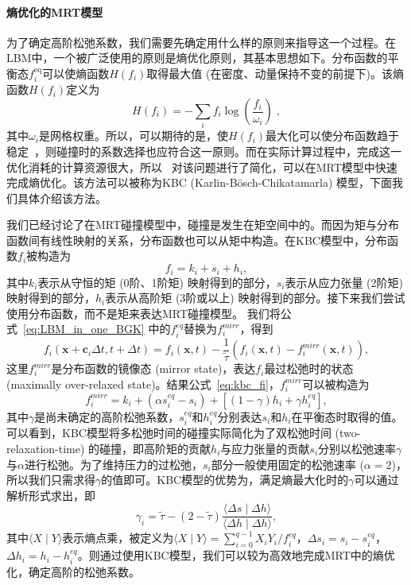 \paragraph{熵优化的MRT模型}
为了确定高阶松弛系数，我们需要先确定用什么样的原则来指导这一个过程。在LBM中，一个被广泛使用的原则是熵优化原则，其基本思想如下。分布函数的平衡态$f^\text{eq}_i$可以使熵函数$H(f_i)$取得最大值 (在密度、动量保持不变的前提下)。该熵函数$H(f_i)$定义为
\begin{equation}
\label{eq:entropy_func}
H(f_i)=-\sum_i f_i \log \left(\frac{f_i}{\omega_i}\right) \;,
\end{equation}
其中$\omega_i$是网格权重。所以，可以期待的是，使$H(f_i)$最大化可以使分布函数趋于稳定~\citep{Kramer-2019}，则碰撞时的系数选择也应符合这一原则。而在实际计算过程中，完成这一优化消耗的计算资源很大，所以~\citet{Karlin-2014} 对该问题进行了简化，可以在MRT模型中快速完成熵优化。该方法可以被称为KBC (Karlin-B\"osch-Chikatamarla) 模型，下面我们具体介绍该方法。

我们已经讨论了在MRT碰撞模型中，碰撞是发生在矩空间中的。而因为矩与分布函数间有线性映射的关系，分布函数也可以从矩中构造。在KBC模型中，分布函数$f_{i}$被构造为
\begin{equation}
f_{i}=k_{i}+s_{i}+h_{i},
\label{eq:kbc_fi}
\end{equation}
其中$k_{i}$表示从守恒的矩 (0阶、1阶矩) 映射得到的部分，$s_{i}$表示从应力张量 (2阶矩) 映射得到的部分，$h_{i}$表示从高阶矩 (3阶或以上) 映射得到的部分。接下来我们尝试使用分布函数，而不是矩来表达MRT碰撞模型。
我们将公式~\ref{eq:LBM_in_one_BGK} 中的$f_i^{eq}$替换为$f_i^{mirr}$，得到
\begin{equation}
    f_{i}(\mathbf{x}+\mathbf{c}_i \Delta t,t+\Delta t)=f_{i}(\mathbf{x},t)-\frac{1}{\tilde{\tau}}(f_{i}(\mathbf{x},t)-f_{i}^{mirr}(\mathbf{x},t)),
    \label{eq:kbc_LBE}
\end{equation}
这里$f_i^{mirr}$是分布函数的镜像态 (mirror state)，表达$f_i$最过松弛时的状态 (maximally over-relaxed state)。结果公式~\ref{eq:kbc_fi}，$f_i^{mirr}$可以被构造为
\begin{equation}
f_{i}^{mirr}=k_{i}+\left(\alpha s_{i}^{e q}-s_{i}\right)+\left[(1-\gamma) h_{i}+\gamma h_{i}^{e q}\right],
\end{equation}
其中$\gamma$是尚未确定的高阶松弛系数，$s_{i}^{e q}$和$h_{i}^{e q}$分别表达$s_i$和$h_i$在平衡态时取得的值。可以看到，KBC模型将多松弛时间的碰撞实际简化为了双松弛时间 (two-relaxation-time) 的碰撞，即高阶矩的贡献$h_{i}$与应力张量的贡献$s_i$分别以松弛速率$\gamma$与$\alpha$进行松弛。为了维持压力的过松弛，$s_i$部分一般使用固定的松弛速率 ($\alpha=2$)，所以我们只需求得$\gamma$的值即可。KBC模型的优势为，满足熵最大化时的$\gamma$可以通过解析形式求出，即
\begin{equation}
\gamma_{i}=\tilde{\tau}-\left(2-\tilde{\tau}\right) \frac{\langle\Delta s \mid \Delta h\rangle}{\langle\Delta h \mid \Delta h\rangle},
\end{equation}
其中$\langle X \mid Y\rangle$表示熵点乘，被定义为$\langle X \mid Y\rangle=\sum_{i=0}^{q-1} X_{i} Y_{i}/{f_{i}^{eq}}$，$\Delta s_{i}=s_{i}-s_{i}^{e q}$，$\Delta h_{i}=h_{i}-h_{i}^{e q}$。则通过使用KBC模型，我们可以较为高效地完成MRT中的熵优化，确定高阶的松弛系数。

